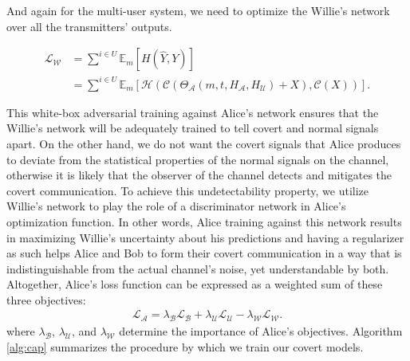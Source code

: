 And again for the multi-user system, we need to optimize the Willie's network over all the transmitters' outputs.

\begin{equation}
	\begin{aligned} \label{multi_willie_loss}
		\mathcal{L}_{\mathcal{W}} & = 
		\sum^{i \in U} \mathbb{E}_{m}[H(\hat{Y}, Y)] \\
		& = \sum^{i \in U}
			\mathbb{E}_{m}[\mathcal{H}(\mathcal{C}(\Theta_{\mathcal{A}}(m, t, H_{\mathcal{A}}, H_{\mathcal{U}}) + X), \mathcal{C}(X))].
	\end{aligned}
\end{equation}

This white-box adversarial training against Alice's network ensures that the Willie's network will be adequately trained to tell covert and normal signals apart. On the other hand, we do not want the covert signals that Alice produces to deviate from the statistical properties of the normal signals on the channel, otherwise it is likely that the observer of the channel detects and mitigates the covert communication. To achieve this undetectability property, we utilize Willie's network to play the role of a discriminator network in Alice's optimization function. In other words, Alice training against this network results in maximizing Willie's uncertainty about his predictions and having a regularizer as such helps Alice and Bob to form their covert communication in a way that is indistinguishable from the actual channel's noise, yet understandable by both. Altogether, Alice's loss function can be expressed as a weighted sum of these three objectives:
\begin{equation}
	\begin{array}{l} \label{alice_loss}
	\mathcal{L}_{\mathcal{A}} = \lambda_{\mathcal{B}} \mathcal{L}_{\mathcal{B}} + \lambda_{\mathcal{U}} \mathcal{L}_{\mathcal{U}} - \lambda_{\mathcal{W}} \mathcal{L}_{\mathcal{W}}.
\end{array}
\end{equation}
where \(\lambda_{\mathcal{B}}\), \(\lambda_{\mathcal{U}}\), and \(\lambda_{\mathcal{W}}\) determine the importance of Alice's objectives. Algorithm \ref{alg:cap} summarizes the procedure by which we train our covert models.

